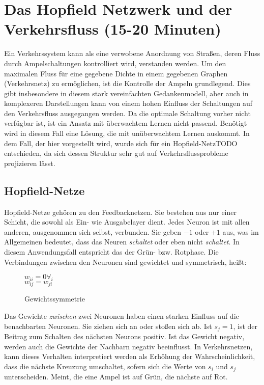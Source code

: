 \section{Das Hopfield Netzwerk und der Verkehrsfluss (15-20 Minuten)}

Ein Verkehrssystem kann als eine verwobene Anordnung von Straßen, deren Fluss durch Ampelschaltungen kontrolliert wird, verstanden werden. Um den maximalen Fluss für eine gegebene Dichte in einem gegebenen Graphen (Verkehrsnetz) zu ermöglichen, ist die Kontrolle der Ampeln grundlegend. Dies gibt insbesondere in diesem stark vereinfachten Gedankenmodell, aber auch in komplexeren Darstellungen kann von einem hohen Einfluss der Schaltungen auf den Verkehrsfluss ausgegangen werden.
Da die optimale Schaltung vorher nicht verfügbar ist, ist ein Ansatz mit überwachtem Lernen nicht passend. Benötigt wird in diesem Fall eine Lösung, die mit unüberwachtem Lernen auskommt. In dem Fall, der hier vorgestellt wird, wurde sich für ein Hopfield-NetzTODO entschieden, da sich dessen Struktur sehr gut auf Verkehrsflussprobleme projizieren lässt.

\subsection{Hopfield-Netze}
Hopfield-Netze gehören zu den Feedbacknetzen. Sie bestehen aus nur einer Schicht, die sowohl als Ein- wie Ausgabelayer dient. Jedes Neuron ist mit allen anderen, ausgenommen sich selbst, verbunden. Sie geben \(-1\) oder \(+1\) aus, was im Allgemeinen bedeutet, dass das Neuren \textit{schaltet} oder eben nicht \textit{schaltet}. In diesem Anwendungsfall entspricht das der Grün- bzw. Rotphase.
Die Verbindungen zwischen den Neuronen sind gewichtet und symmetrisch, heißt:

\begin{figure}[H]
    \( w_{ii} = 0 \forall_i \)\\
    \( w_{ij} = w_{ji} \)\\
    \caption{Gewichtssymmetrie}
    \label{func:weight_symmetry}
\end{figure}

Das Gewichte \textit{zwischen} zwei Neuronen haben einen starken Einfluss auf die benachbarten Neuronen. Sie ziehen sich an oder stoßen sich ab. Ist \(s_j = 1\), ist der Beitrag zum Schalten des nächsten Neurons positiv. Ist das Gewicht negativ, werden auch die Gewichte der Nachbarn negativ beeinflusst. In Verkehrsnetzen, kann dieses Verhalten interpretiert werden als Erhöhung der Wahrscheinlichkeit, dass die nächste Kreuzung umschaltet, sofern sich die Werte von \(s_i\) und \(s_j\) unterscheiden. Meint, die eine Ampel ist auf Grün, die nächste auf Rot.


